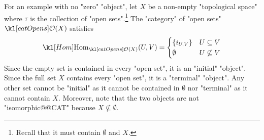 \documentclass[main.tex]{subfiles}
\begin{document}
\begin{exmps}
\begin{enumerate}
		For an example with no "zero" "object", let $X$ be a non-empty "topological space" where $\tau$ is the collection of "open sets".\footnote{Recall that it must contain $\emptyset$ and $X$.} The "category" of "open sets" $\catOpens(X)$ satisfies
		\[\Hom_{\catOpens(X)}(U,V) = \begin{cases}\{i_{U,V}\} & U \subseteq V\\ \emptyset & U \not\subseteq V\end{cases}\]
		Since the empty set is contained in every "open set", it is an "initial" "object". Since the full set $X$ contains every "open set", it is a "terminal" "object". Any other set cannot be "initial" as it cannot be contained in $\emptyset$ nor "terminal" as it cannot contain $X$. Moreover, note that the two objects are not "isomorphic@@CAT" because $X \not\subseteq \emptyset$.
	\end{enumerate}
\end{exmps}
\end{document}

